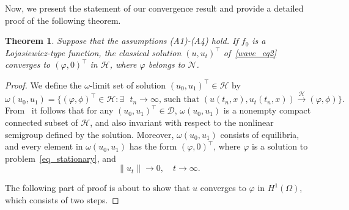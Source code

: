 \documentclass{elsarticle}
\newtheorem{theorem}{Theorem}[section]
\begin{document}
Now, we present the statement of our convergence result and provide a detailed proof of the following theorem.

\begin{theorem}\label{thm:main2}
Suppose that the assumptions {\rm(A1)}-{\rm(A4)} hold. If $f_0$ is a {\L}ojasiewicz-type function, the classical solution $(u, u_t)^\top$ of~\eqref{wave_eq2} converges to $(\varphi, 0)^\top$ in $\mathcal{H}$, where $\varphi$ belongs to $\mathcal{N}$.
\end{theorem}
\begin{proof}
We define the $\omega$-limit set of solution $(u_0, u_1)^\top\in\mathcal{H}$ by
\[
	\omega(u_0, u_1) = \{ (\varphi, \phi)^\top\in \mathcal{H}: \textrm{$\exists$ $t_{n}\rightarrow \infty$, such that $(u(t_{n}, x),  u_{t}(t_{n}, x))\xrightarrow{\mathcal{H}}(\varphi, \phi)$}\}.
\]
From~\cite[Theorem 5.2]{CEL2002} it follows that for any $(u_{0}, u_{1})^\top \in \mathcal{D}$, $\omega(u_{0}, u_{1})$ is a nonempty compact connected subset of $\mathcal{H}$, and also invariant with respect to the nonlinear semigroup defined by the solution. Moreover, $\omega(u_{0}, u_{1})$ consists of equilibria, and every element in $\omega(u_{0}, u_{1})$ has the form $(\varphi, 0)^\top$, where $\varphi$ is a solution to problem~\eqref{eq_stationary}, and
\begin{equation}
	\|u_t\|\rightarrow 0, \quad t\rightarrow \infty. \label{thm5_1}
\end{equation}

The following part of proof is about to show that $u$ converges to $\varphi$ in $H^1(\Omega)$, which consists of two steps.


\end{proof}
\end{document}
